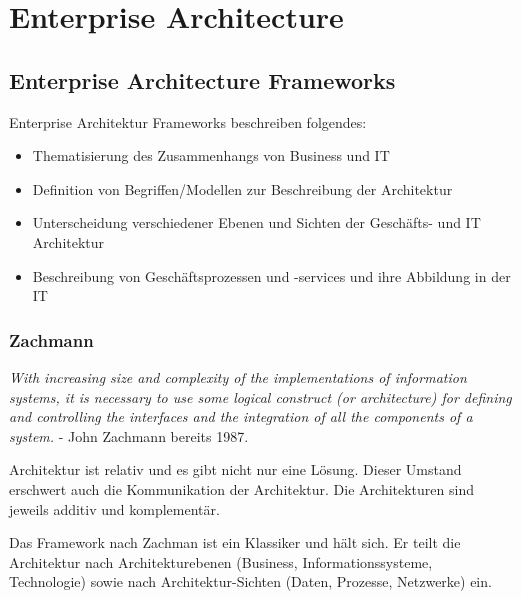 \chapter{Enterprise Architecture}


\section{Enterprise Architecture Frameworks}

Enterprise Architektur Frameworks beschreiben folgendes:
\begin{itemize}
	\item Thematisierung des Zusammenhangs von Business und IT
	
	\item Definition von Begriffen/Modellen zur Beschreibung der Architektur
	
	\item Unterscheidung verschiedener Ebenen und Sichten der Geschäfts- und IT Architektur
	
	\item Beschreibung von Geschäftsprozessen und -services und ihre Abbildung in der IT
\end{itemize}

\subsection{Zachmann}

\textit{With increasing size and complexity of the implementations of information systems, it is necessary to use some logical construct (or architecture) for defining and controlling the interfaces and the integration of all the components of a system.} - John Zachmann bereits 1987.

Architektur ist relativ und es gibt nicht nur eine Lösung. Dieser Umstand erschwert auch die Kommunikation der Architektur. Die Architekturen sind jeweils additiv und komplementär.

Das Framework nach Zachman ist ein Klassiker und hält sich. Er teilt die Architektur nach Architekturebenen (Business, Informationssysteme, Technologie) sowie nach Architektur-Sichten (Daten, Prozesse, Netzwerke) ein.

